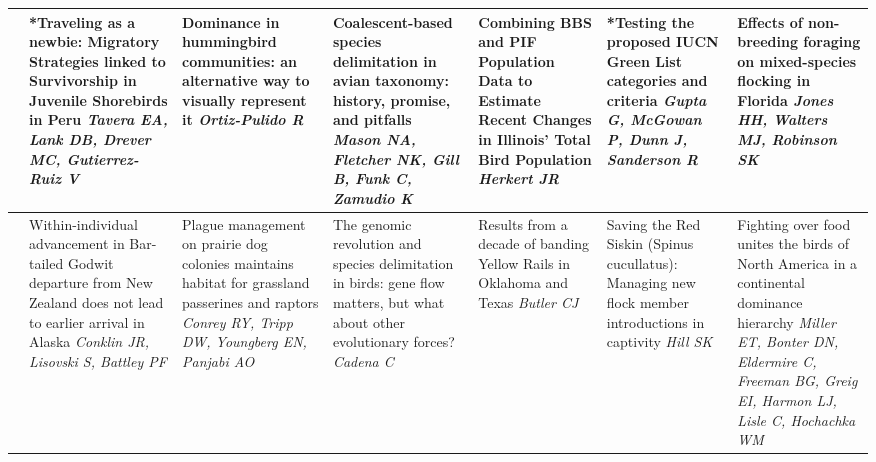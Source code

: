 \begin{tabular}{|x{0.75cm}|a{2.25cm}|x{2.25cm}|a{2.25cm}|x{2.25cm}|x{2.25cm}|a{2.25cm}|}
&*Traveling as a newbie:  Migratory Strategies linked to Survivorship in Juvenile Shorebirds in Peru \newline \newline \textit{Tavera EA, Lank DB, Drever MC, Gutierrez-Ruiz V} & Dominance in hummingbird communities: an alternative  way to visually represent it \newline \newline \textit{Ortiz-Pulido R} & Coalescent-based species delimitation in avian taxonomy: history, promise, and pitfalls \newline \newline \textit{Mason NA, Fletcher NK, Gill B, Funk C, Zamudio K} & Combining BBS and PIF Population Data to Estimate Recent Changes in Illinois’ Total Bird Population \newline \newline \textit{Herkert JR} & *Testing the proposed IUCN Green List categories and criteria \newline \newline \textit{Gupta G, McGowan P, Dunn J, Sanderson R} & Effects of non-breeding foraging on mixed-species flocking in Florida \newline \newline \textit{Jones HH, Walters MJ, Robinson SK}\\
\hline
{}&Within-individual advancement in Bar-tailed Godwit departure from New Zealand does not lead to earlier arrival in Alaska \newline \newline \textit{Conklin JR, Lisovski S, Battley PF} & Plague management on prairie dog colonies maintains habitat for grassland passerines and raptors \newline \newline \textit{Conrey RY, Tripp DW, Youngberg EN, Panjabi AO} & The genomic revolution and species delimitation in birds: gene flow matters, but what about other evolutionary forces? \newline \newline \textit{Cadena C} & Results from a decade of banding Yellow Rails in Oklahoma and Texas \newline \newline \textit{Butler CJ} & Saving the Red Siskin (Spinus cucullatus): Managing new flock member introductions in captivity \newline \newline \textit{Hill SK} & Fighting over food unites the birds of North America in a continental dominance hierarchy \newline \newline \textit{Miller ET, Bonter DN, Eldermire C, Freeman BG, Greig EI, Harmon LJ, Lisle C, Hochachka WM}\\

\end{tabular}
